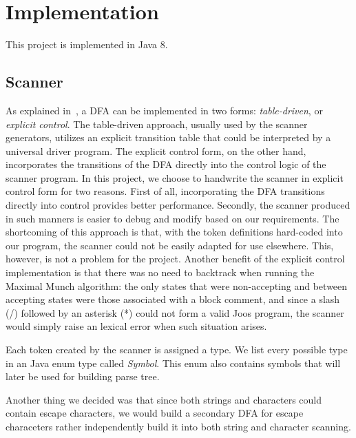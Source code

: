 \chapter{Implementation}

This project is implemented in Java 8.

\section{Scanner}
\label{scanner_implementation}

As explained in~\cite{fischer2009crafting}, a DFA can be implemented in two forms: \emph{table-driven}, or \emph{explicit control}. The table-driven approach, usually used by the scanner generators, utilizes an explicit transition table that could be interpreted by a universal driver program. The explicit control form, on the other hand, incorporates the transitions of the DFA directly into the control logic of the scanner program. In this project, we choose to handwrite the scanner in explicit control form for two reasons. First of all, incorporating the DFA transitions directly into control provides better performance. Secondly, the scanner produced in such manners is easier to debug and modify based on our requirements. The shortcoming of this approach is that, with the token definitions hard-coded into our program, the scanner could not be easily adapted for use elsewhere. This, however, is not a problem for the project. 
Another benefit of the explicit control implementation is that there was no need to backtrack when running the Maximal Munch algorithm:
  the only states that were non-accepting and between accepting states were those associated with a block comment,
  and since a slash (/) followed by an asterisk (*) could not form a valid Joos program, the scanner would simply raise an lexical error when such situation arises.

Each token created by the scanner is assigned a type. We list every possible type in an Java enum type called \emph{Symbol}. This enum also contains symbols that will later be used for building parse tree.

Another thing we decided was that since both strings and characters could contain escape characters,
  we would build a secondary DFA for escape characeters rather independently build it into both string and character scanning.






